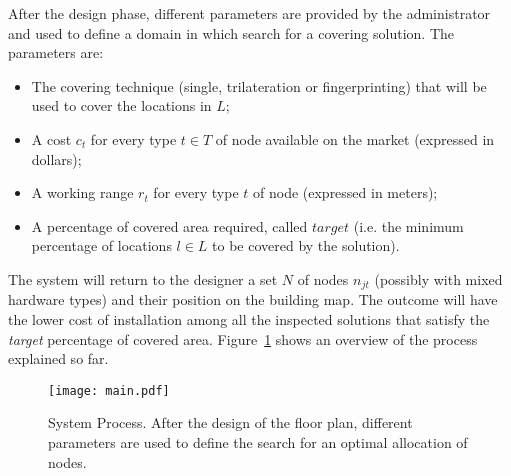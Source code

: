 After the design phase, different parameters are provided by the administrator and used to define a domain in which search for a covering solution. The parameters are:
\begin{itemize}
\item The covering technique (single, trilateration or fingerprinting) that will be used to cover the locations in $L$;
\item A cost \(c_t\) for every type \(t \in T\) of node available on the market (expressed in dollars);
\item A working range \(r_t\) for every type \(t\) of node (expressed in meters);
\item A percentage of covered area required, called $target$ (i.e. the minimum percentage of locations $l \in L$ to be covered by the solution).
\end{itemize}
The system will return to the designer a set $N$ of nodes $n_{jt}$ (possibly with mixed hardware types) and their position on the building map. The outcome will have the lower cost of installation among all the inspected solutions that satisfy the \emph{target} percentage of covered area. Figure~\ref{fig:main} shows an overview of the process explained so far.

\begin{figure}[h!tb]
\centering\texttt{[image: main.pdf]}
\caption[System process of the CAD deployment tool for indoor WSNs.]{System Process. After the design of the floor plan, different parameters are used to define the search for an optimal allocation of nodes.}
\label{fig:main}
\end{figure}


